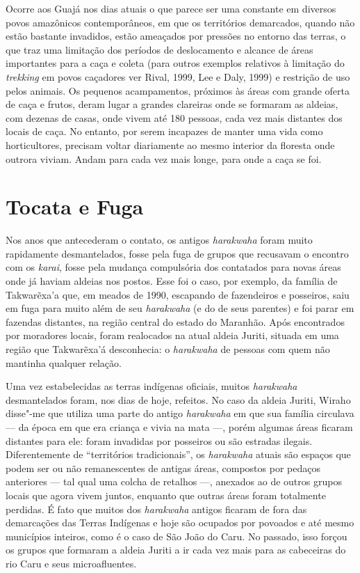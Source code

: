 Ocorre aos Guajá nos dias atuais o que parece ser uma constante em
diversos povos amazônicos contemporâneos, em que os territórios
demarcados, quando não estão bastante invadidos, estão ameaçados por
pressões no entorno das terras, o que traz uma limitação dos períodos de
deslocamento e alcance de áreas importantes para a caça e coleta (para
outros exemplos relativos à limitação do \emph{trekking} em povos
caçadores ver Rival, 1999, Lee e Daly, 1999) e restrição de uso pelos
animais. Os pequenos acampamentos, próximos às áreas com grande oferta
de caça e frutos, deram lugar a grandes clareiras onde se formaram as
aldeias, com dezenas de casas, onde vivem até 180 pessoas, cada vez mais
distantes dos locais de caça. No entanto, por serem incapazes de manter
uma vida como horticultores, precisam voltar diariamente ao mesmo
interior da floresta onde outrora viviam. Andam para cada vez mais
longe, para onde a caça se foi.

\section{Tocata e Fuga}

Nos anos que antecederam o contato, os antigos \emph{harakwaha} foram
muito rapidamente desmantelados, fosse pela fuga de grupos que recusavam
o encontro com os \emph{karai}, fosse pela mudança compulsória dos
contatados para novas áreas onde já haviam aldeias nos postos. Esse foi
o caso, por exemplo, da família de Takwarẽxa'a que, em meados de 1990,
escapando de fazendeiros e posseiros, saiu em fuga para muito além de
seu \emph{harakwaha} (e do de seus parentes) e foi parar em fazendas
distantes, na região central do estado do Maranhão. Após encontrados por
moradores locais, foram realocados na atual aldeia Juriti, situada em
uma região que Takwarẽxa'á desconhecia: o \emph{harakwaha} de pessoas
com quem não mantinha qualquer relação.

Uma vez estabelecidas as terras indígenas oficiais, muitos
\emph{harakwaha} desmantelados foram, nos dias de hoje, refeitos. No
caso da aldeia Juriti, Wiraho disse"-me que utiliza
uma parte do antigo \emph{harakwaha} em que sua família circulava --- da
época em que era criança e vivia na mata ---, porém algumas áreas ficaram
distantes para ele: foram invadidas por posseiros ou são estradas
ilegais. Diferentemente de ``territórios tradicionais'', os
\emph{harakwaha} atuais são espaços que podem ser ou não remanescentes
de antigas áreas, compostos por pedaços anteriores --- tal qual uma colcha
de retalhos ---, anexados ao de outros grupos locais que agora vivem
juntos, enquanto que outras áreas foram totalmente perdidas. É fato que
muitos dos \emph{harakwaha} antigos ficaram de fora das demarcações das
Terras Indígenas e hoje são ocupados por povoados e até mesmo municípios
inteiros, como é o caso de São João do Caru. No passado, isso forçou os
grupos que formaram a aldeia Juriti a ir cada vez mais para as
cabeceiras do rio Caru e seus microafluentes.

